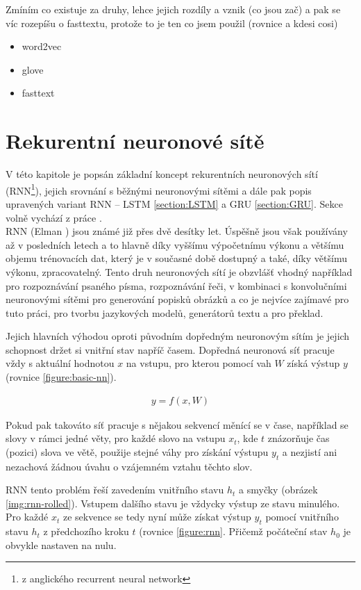 Zmíním co existuje za druhy, lehce jejich rozdíly a vznik (co jsou zač) a pak se víc rozepíšu o fasttextu, protože to je ten co jsem použil (rovnice a kdesi cosi)
\begin{itemize}
  \item word2vec
  \item glove
  \item fasttext
\end{itemize}

\section{Rekurentní neuronové sítě}\label{section:rnn}
V této kapitole je popsán základní koncept rekurentních neuronových sítí (RNN\footnote{z anglického recurrent neural network}), jejich srovnání s běžnými neuronovými sítěmi a dále pak popis upravených variant RNN -- LSTM \ref{section:LSTM} a GRU \ref{section:GRU}. Sekce volně vychází z práce \cite{nmtThesis}.\\


RNN (Elman \cite{rnn}) jsou známé již přes dvě desítky let. Úspěšně jsou však používány až v posledních letech a to hlavně díky vyššímu výpočetnímu výkonu a většímu objemu trénovacích dat, který je v současné době dostupný a také, díky většímu výkonu, zpracovatelný. Tento druh neuronových sítí je obzvlášť vhodný například pro rozpoznávání psaného písma, rozpoznávání řeči, v kombinaci s konvolučními neuronovými sítěmi pro generování popisků obrázků a co je nejvíce zajímavé pro tuto práci, pro tvorbu jazykových modelů, generátorů textu a pro překlad.

Jejich hlavních výhodou oproti původním dopředným neuronovým sítím je jejich schopnost držet si vnitřní stav napříč časem. Dopředná neuronová síť pracuje vždy s aktuální hodnotou $x$ na vstupu, pro kterou pomocí vah $W$ získá výstup $y$ (rovnice \ref{figure:basic-nn}).

\begin{align}\label{figure:basic-nn}
  y = f (x, W)
\end{align}

Pokud pak takováto síť pracuje s nějakou sekvencí měnící se v čase, například se slovy v rámci jedné věty, pro každé slovo na vstupu $x_t$, kde $t$ znázorňuje čas (pozici) slova ve větě, použije stejné váhy pro získání výstupu $y_t$ a nezjistí ani nezachová žádnou úvahu o vzájemném vztahu těchto slov.

RNN tento problém řeší zavedením vnitřního stavu $h_t$ a smyčky (obrázek \ref{img:rnn-rolled}). Vstupem dalšího stavu je vždycky výstup ze stavu minulého. Pro každé $x_t$ ze sekvence se tedy nyní může získat výstup $y_t$ pomocí vnitřního stavu $h_t$ z předchozího kroku $t$ (rovnice \ref{figure:rnn}. Přičemž počáteční stav  $h_0$ je obvykle nastaven na nulu.

